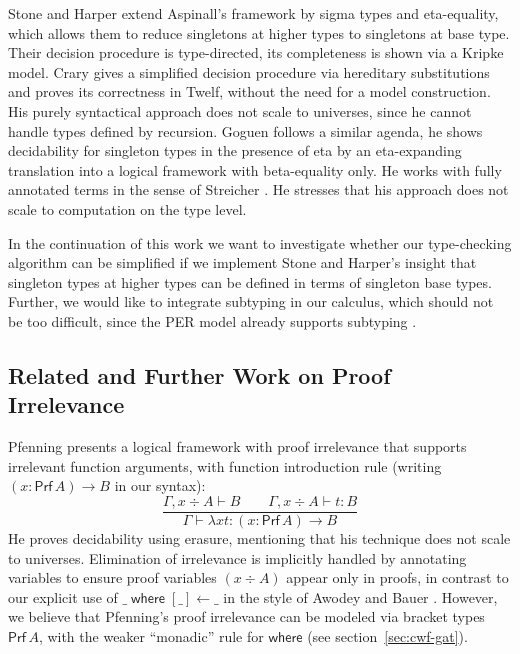 \documentclass{LMCS}
\theoremstyle{plain}\newtheorem{satz}[thm]{Satz}
\newcommand{\of}{\!:\!}
\newcommand{\derN}{\vdash}
\newcommand{\ABwhere}[3]{#1 \; \mathsf{where}\; [#2] \leftarrow #3}
\newcommand{\funT}[2]{(#1 \of #2) \to}
\newcommand{\boxty}[1]{[#1]}
\renewcommand{\boxty}[1]{\mathsf{Prf}\,#1}
\newcommand{\whereraw}{\mathsf{where}}
\begin{document}
Stone and Harper \cite{stoneHarper:tocl06} extend Aspinall's framework
by sigma types and eta-equality, which allows them to reduce
singletons at higher types to singletons at base type.  Their decision
procedure is type-directed, its completeness is shown via a Kripke
model.  Crary \cite{crary:lfmtp08} gives a simplified decision
procedure via hereditary substitutions and proves its correctness in
Twelf, without the need for a model construction.  His purely
syntactical approach does not scale to universes, since he cannot
handle types defined by recursion.  Goguen \cite{goguen:syntacticEta}
follows a similar agenda, he shows decidability for singleton types
in the presence of eta by an eta-expanding translation into a logical
framework with beta-equality only.  He works with fully annotated
terms in the sense of Streicher \cite{streicher:PhD}.  He stresses
that his approach does not scale to computation on the type level.

In the continuation of this work we want to investigate whether our
type-checking algorithm can be simplified if we implement Stone and
Harper's insight that singleton types at higher types can be defined
in terms of singleton base types.  Further, we would like to integrate
subtyping in our calculus, which should not be too difficult, since
the PER model already supports subtyping
\cite{aspinall:csl94,coquandPollackTakeyama:fundinf05}. 


\subsection{Related and Further Work on Proof Irrelevance}

Pfenning \cite{pfenning:intextirr} presents a logical framework with
proof irrelevance that supports irrelevant function arguments,
with function introduction rule 
(writing $\funT x {\boxty A} B$ in our syntax):  
\[
  \dfrac{\Gamma, x \div A \derN B \qquad \Gamma, x \div A \derN t : B
    }{\Gamma \derN \lambda x t :  \funT x {\boxty A} B}
\]
He proves decidability using erasure, mentioning that
his technique does not scale to universes.  
Elimination of irrelevance is implicitly handled by annotating
variables to ensure proof variables $(x \div A)$
appear only in proofs,
in contrast to our explicit use of $\ABwhere \_ \_ \_$ in the style of Awodey and Bauer
\cite{awodeyBauer:propositionsAsTypes}.  However, we believe that
Pfenning's proof irrelevance can be modeled via bracket types 
$\boxty A$, with the weaker ``monadic'' rule for $\whereraw$ (see
section~\ref{sec:cwf-gat}). 
\end{document}
